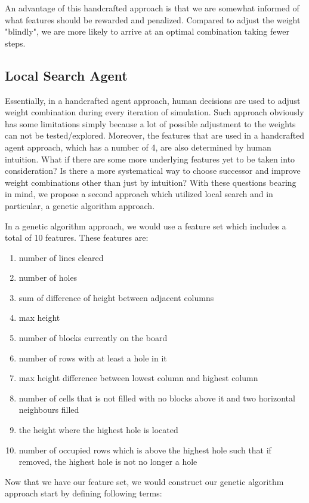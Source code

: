 \documentclass[letterpaper]{article} %
\begin{document}
An advantage of this handcrafted approach is that we are somewhat informed of what features should be rewarded and penalized. Compared to adjust the weight "blindly", we are more likely to arrive at an optimal combination taking fewer steps.

\subsection{Local Search Agent}

Essentially, in a handcrafted agent approach, human decisions are used to adjust weight combination during every iteration of simulation. Such approach obviously has some limitations simply because a lot of possible adjustment to the weights can not be tested/explored. Moreover, the features that are used in a handcrafted agent approach, which has a number of 4, are also determined by human intuition. What if there are some more underlying features yet to be taken into consideration? Is there a more systematical way to choose successor and improve weight combinations other than just by intuition? With these questions bearing in mind, we propose a second approach which utilized local search and in particular, a genetic algorithm approach.

In a genetic algorithm approach, we would use a feature set which includes a total of 10 features. These features are:
\begin{enumerate}
  \item number of lines cleared
  \item number of holes
  \item sum of difference of height between adjacent columns
  \item max height
  \item number of blocks currently on the board
  \item number of rows with at least a hole in it
  \item max height difference between lowest column and highest column
  \item number of cells that is not filled with no blocks above it and two horizontal neighbours filled
  \item the height where the highest hole is located
  \item number of occupied rows which is above the highest hole such that if removed, the highest hole is not no longer a hole
\end{enumerate}

Now that we have our feature set, we would construct our genetic algorithm approach start by defining following terms:
\end{document}
